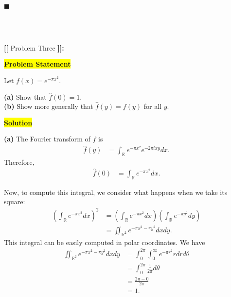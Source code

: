 \documentclass[12pt]{article}
\newcommand{\mybox}{%
    \collectbox{%
        \setlength{\fboxsep}{2pt}%
        \fbox{\BOXCONTENT}%
    }%
}
\begin{document}
\hfill$\blacksquare$

\vfill

\begin{center}
\\
\vspace{2mm}
\vspace{-0.65cm}
\hrulefill \\
\vspace{-0.95cm}
\hrulefill
\end{center}

\pagebreak

\noindent \textbf{{\huge [}{\Large [}} Problem Three \textbf{{\Large ]}{\huge ]}}{\Large \textbf{:}}

\vspace{3mm}

\noindent\mybox{\colorbox{yellow}{\textbf{Problem Statement}}}\hspace{3mm}\hrulefill

\noindent Let $f(x) = e^{-\pi x^2}$.
\begin{flushleft}
\textbf{(a)} Show that $\hat{f}(0) = 1.$ \\
\textbf{(b)} Show more generally that $\hat{f}(y) = f(y)$ for all $y$. 
\end{flushleft}

\noindent\mybox{\colorbox{yellow}{\textbf{Solution}}}\hspace{3mm}\hrulefill

\noindent \textbf{(a)} The Fourier transform of $f$ is 
\begin{align}
    \hat{f}(y) &= \int_\mathbb{R} e^{-\pi x^2} e^{-2\pi i xy} dx.
\end{align}
Therefore,
\begin{align}
    \hat{f}(0) &= \int_\mathbb{R} e^{-\pi x^2} dx.
\end{align}

 Now, to compute this integral, we consider what happens when we take its square:
\begin{align}
    \left(\int_{\mathbb{R}} e^{-\pi x^2} dx\right)^2 &= \left(\int_\mathbb{R} e^{-\pi x^2} dx\right)\left(\int_\mathbb{R}e^{-\pi y^2}dy\right) \\
    &= \iint_{\mathbb{R}^2} e^{-\pi x^2 -\pi y^2} dxdy.
\end{align}
This integral can be easily computed in polar coordinates. We have
\begin{align}
    \iint_{\mathbb{R}^2} e^{-\pi x^2 -\pi y^2} dxdy &= \int_{0}^{2\pi}\int_{0}^{\infty} e^{-\pi r^2} r dr d\theta \\
    &=\int_0^{2\pi}\frac{1}{2\pi} d\theta \\
    &= \frac{2\pi-0}{2\pi} \\
    &= 1.
\end{align}
\end{document}
